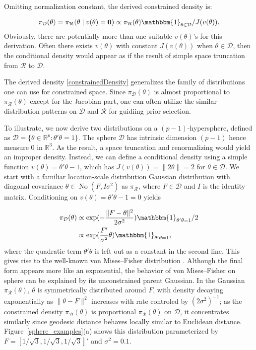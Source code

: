 \documentclass[10pt,fleqn]{article}
\newcommand{\be}{\begin{equation}\begin{aligned}}
\newcommand{\ee}{\end{aligned}\end{equation}}
\newcommand{\bb}[1]{\mathbb{#1}}
\newcommand{\mc}[1]{\mathcal{#1}}
\DeclareMathOperator{\No}{No}
\DeclareMathOperator{\1}{\mathbbm{1}}
\begin{document}
Omitting normalization constant, the derived constrained density is:

\be
\label{constrainedDensity}
\pi_{\mc D}(\theta)=\pi_{\mc R}(\theta\mid v(\theta)={\bf 0})\propto \pi_{\mc R}(\theta) \mathbbm{1}_{\theta\in \mc
D}/J(v(\theta)).
\ee
Obviously, there are potentially more than one suitable $v(\theta)$'s for
this derivation. Often there exists $v(\theta)$ with constant
$J(v(\theta))$ when $\theta\in\mc D$, then the conditional density would appear as if
the result of simple space truncation
from $\mc R$ to $\mc D$.

The derived density \eqref{constrainedDensity} generalizes the family of distributions one can use for constrained space. Since $\pi_{\mc D}(\theta)$
is almost proportional to $\pi_{\mc R}(\theta)$ except for the Jacobian part,
one can often utilize the similar distribution patterns on $\mc D$
and $\mc R$ for guidiing prior selection.


To illustrate, we now derive two distributions on a $(p-1)$-hypersphere, defined as $\mc
D=\{\theta\in
\bb R^p:\theta'\theta=1\}$. The sphere $\mc D$ has intrinsic dimension $(p-1)$ hence measure $0$ in $\bb R^3 $. As the result, a  space truncation and renormalizing would
yield an improper density. Instead, we can define a conditional density using
a simple  function  $v(\theta)=\theta'\theta-1$,
which has $J(v(\theta))=\|2\theta\|=2$ for $\theta\in \mc D$.
 We start with a familiar
location-scale distribution Gaussian distribution with diagonal
covariance $\theta \in \No(F,I\sigma^2)$ as $\pi_{\mc
R}$, where $F\in \mc D $ and $I$ is the identity matrix. Conditioning on $v(\theta)=\theta'\theta-1=0$ yields

\be
\pi_{\mc D}(\theta) &\propto
\exp(-\frac{\|F-\theta\|^2}{2\sigma^2})
\mathbbm{1}_{\theta'\theta=1}/2 \\
& \propto
\exp(\frac{F'}{\sigma^2}\theta)
\mathbbm{1}_{\theta'\theta=1}
,\ee
where the quadratic term $\theta'\theta$ is left out as a constant in the second line. This gives rise to the well-known von
Mises--Fisher distribution \citep{khatri1977mises}. Although the final form
appears more
like an exponential, the behavior of von
Mises--Fisher
on sphere can be explained by its unconstrained parent Gaussian.
In the Gaussian $\pi_{\mc
R}(\theta)$, $\theta$ is symmetrically distributed around $F$, with density
decaying exponentially as $\| \theta-F\|^2$ increases with rate controled by
$({2\sigma^2})^{-1}$; as the constrained
density $\pi_{\mc D}(\theta)$ is proportional $\pi_{\mc R}(\theta)$ on $\mc
D$, it concentrates
similarly since geodesic distance behaves locally similar to Euclidean distance.  Figure~\ref{sphere_examples}(a) shows this distribution parameterized by $F=[1/\sqrt{3},1/\sqrt{3},1/\sqrt{3}]'$ and $\sigma^2=0.1$.
\end{document}

